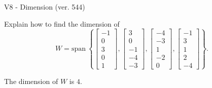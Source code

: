 \begin{exercise}
  \begin{exerciseTitle}V8 - Dimension (ver. 544)\end{exerciseTitle}
  \begin{exerciseStatement}
    Explain how to find the dimension of 
\[W=\mathrm{span}\ \left\{\left[\begin{array}{r}
-1 \\
0 \\
3 \\
0 \\
1
\end{array}\right] , \left[\begin{array}{r}
3 \\
0 \\
-1 \\
-4 \\
-3
\end{array}\right] , \left[\begin{array}{r}
-4 \\
-3 \\
1 \\
-2 \\
0
\end{array}\right] , \left[\begin{array}{r}
-1 \\
3 \\
1 \\
2 \\
-4
\end{array}\right]\right\}.\]



  \end{exerciseStatement}
  \begin{exerciseAnswer}
   The dimension of \(W\) is  \(4\).
  


  \end{exerciseAnswer}
\end{exercise}